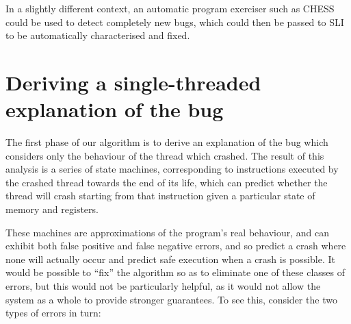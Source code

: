 \documentclass[10pt,twocolumn,preprint,natbib,authoryear]{sigplanconf}
\begin{document}
In a slightly different context, an automatic program exerciser such
as CHESS\cite{Musuvathi2008} could be used to detect completely new
bugs, which could then be passed to SLI to be automatically
characterised and fixed.

\section{Deriving a single-threaded explanation of the bug}

The first phase of our algorithm is to derive an explanation of the
bug which considers only the behaviour of the thread which crashed.
The result of this analysis is a series of state machines,
corresponding to instructions executed by the crashed thread towards
the end of its life, which can predict whether the thread will crash
starting from that instruction given a particular state of memory and
registers.

These machines are approximations of the program's real behaviour, and
can exhibit both false positive and false negative errors, and so
predict a crash where none will actually occur and predict safe
execution when a crash is possible.  It would be possible to ``fix''
the algorithm so as to eliminate one of these classes of errors, but
this would not be particularly helpful, as it would not allow the
system as a whole to provide stronger guarantees.  To see this,
consider the two types of errors in turn:
\end{document}
